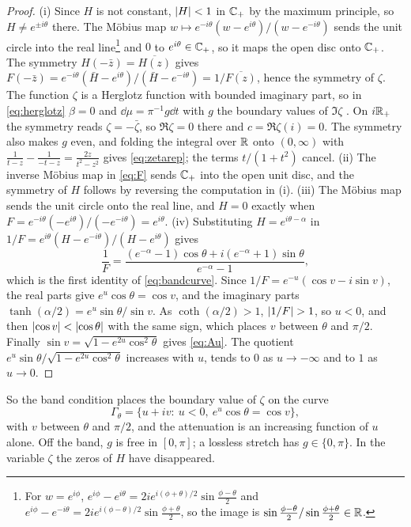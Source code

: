 \begin{proof}
(i) Since $H$ is not constant, $\left|H\right|<1$ in $\mathbb C_{+}$ by the maximum principle,
so $H\ne e^{\pm i\theta}$ there. The M\"obius map
$w\mapsto e^{-i\theta}(w-e^{i\theta})/(w-e^{-i\theta})$ sends the unit circle into
the real line\footnote{For $w=e^{i\phi}$,
$e^{i\phi}-e^{i\theta}=2ie^{i(\phi+\theta)/2}\sin\frac{\phi-\theta}2$ and
$e^{i\phi}-e^{-i\theta}=2ie^{i(\phi-\theta)/2}\sin\frac{\phi+\theta}2$, so the
image is $\sin\frac{\phi-\theta}2/\sin\frac{\phi+\theta}2\in\mathbb R$.} and $0$ to
$e^{i\theta}\in\mathbb C_{+}$, so it maps the open disc onto $\mathbb C_{+}$. The symmetry
$H(-\bar z)=\overline{H(z)}$ gives
$F(-\bar z)=e^{-i\theta}(\bar H-e^{i\theta})/(\bar H-e^{-i\theta})
=1/\overline{F(z)}$, hence the symmetry of $\zeta$. The function $\zeta$ is a
Herglotz function with bounded imaginary part, so in \eqref{eq:herglotz}
$\beta=0$ and $\dd\mu=\pi^{-1}g\dd t$ with $g$ the boundary values of $\Im\zeta$
\cite[Ch.~I]{garnett}. On $i\mathbb R_+$ the symmetry reads $\zeta=-\bar\zeta$, so
$\Re\zeta=0$ there and $c=\Re\zeta(i)=0$. The symmetry also makes $g$ even,
and folding the integral over $\mathbb R$ onto $(0,\infty)$ with
$\frac1{t-z}-\frac1{-t-z}=\frac{2z}{t^2-z^2}$ gives \eqref{eq:zetarep}; the
terms $t/(1+t^2)$ cancel.
(ii) The inverse M\"obius map in \eqref{eq:F} sends $\mathbb C_{+}$ into the open unit
disc, and the symmetry of $H$ follows by reversing the computation in (i).
(iii) The M\"obius map sends the unit circle onto the real line, and
$H=0$ exactly when $F=e^{-i\theta}(-e^{i\theta})/(-e^{-i\theta})=e^{i\theta}$.
(iv) Substituting $H=e^{i\theta-\alpha}$ in $1/F=e^{i\theta}(H-e^{-i\theta})/(H-e^{i\theta})$
gives
\[
\frac1F=\frac{(e^{-\alpha}-1)\cos\theta+i(e^{-\alpha}+1)\sin\theta}{e^{-\alpha}-1},
\]
which is the first identity of \eqref{eq:bandcurve}. Since
$1/F=e^{-u}(\cos v-i\sin v)$, the real parts give $e^u\cos\theta=\cos v$, and
the imaginary parts $\tanh(\alpha/2)=e^u\sin\theta/\sin v$. As
$\coth(\alpha/2)>1$, $\abs{1/F}>1$, so $u<0$, and then $\left|\cos v\right|<\left|\cos\theta\right|$
with the same sign, which places $v$ between $\theta$ and $\pi/2$. Finally
$\sin v=\sqrt{1-e^{2u}\cos^2\theta}$ gives \eqref{eq:Au}. The quotient
$e^u\sin\theta/\sqrt{1-e^{2u}\cos^2\theta}$ increases with $u$, tends to $0$ as
$u\to-\infty$ and to $1$ as $u\to0$.
\end{proof}

So the band condition places the boundary value of $\zeta$ on the curve
\[
\Gamma_\theta=\{u+iv:\ u<0,\ e^u\cos\theta=\cos v\},
\]
with $v$ between $\theta$ and $\pi/2$, and the attenuation is an increasing
function of $u$ alone. Off the band, $g$ is free in $[0,\pi]$; a lossless
stretch has $g\in\{0,\pi\}$. In the variable $\zeta$ the zeros of $H$ have
disappeared.


